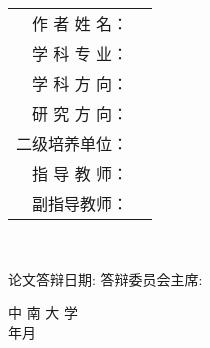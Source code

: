 \begin{center}
	\begin{tabular}{>{\songti}r >{\songti}l}
		作 者 姓 名：\quad     &\myName  \\
		学 科 专 业：\quad               &\major  \\
		学 科 方 向：\quad               &\discipline  \\
		研 究 方 向：\quad               &\researchTopic  \\
		二级培养单位：\quad    & \school \\
		指 导 教 师：\quad               &\mySupervisor\\
		副指导教师：\quad               &\myAssociateSupervisor\\
	\end{tabular}\\
	\vspace{3em}
	
	{\songti {} 论文答辩日期:\uline{\makebox[8.5em][c]{}}}
	\hfill
	{\songti {} 答辩委员会主席:\uline{\makebox[5em][c]{}}}
	
	\vspace{3em}
	{\songti {} 中 南 大 学\\  年 月}        
\end{center}
\newpage \thispagestyle{empty}~
